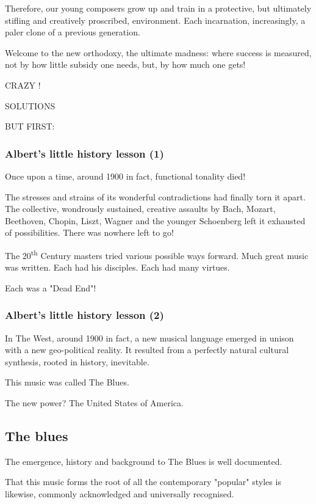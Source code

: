 \documentclass{article}
\begin{document}
Therefore, our young composers grow up and train in a protective, but ultimately stifling and creatively proscribed, environment.
Each incarnation, increasingly, a paler clone of a previous generation.

Welcome to the new orthodoxy, the ultimate madness: where success is measured, not by how little subsidy one needs, but, by how much one gets!

CRAZY !

SOLUTIONS

BUT FIRST:

\subsubsection{Albert’s little history lesson (1)}

Once upon a time, around 1900 in fact, functional tonality died!

The stresses and strains of its wonderful contradictions had finally torn it apart.
The collective, wondrously sustained, creative assaults by Bach, Mozart, Beethoven, Chopin, Liszt, Wagner and the younger Schoenberg left it exhausted of possibilities.
There was nowhere left to go!

The 20\textsuperscript{th} Century masters tried various possible ways forward.
Much great music was written.
Each had his disciples.
Each had many virtues.

Each was a "Dead End"!

\subsubsection{Albert’s little history lesson (2)}

In The West, around 1900 in fact, a new musical language emerged in unison with a new geo-political reality.
It resulted from a perfectly natural cultural synthesis, rooted in history, inevitable.

This music was called The Blues.

The new power?
The United States of America.

\subsection{The blues}

The emergence, history and background to The Blues is well documented.

That this music forms the root of all the contemporary "popular" styles is likewise, commonly acknowledged and universally recognised.
\end{document}
